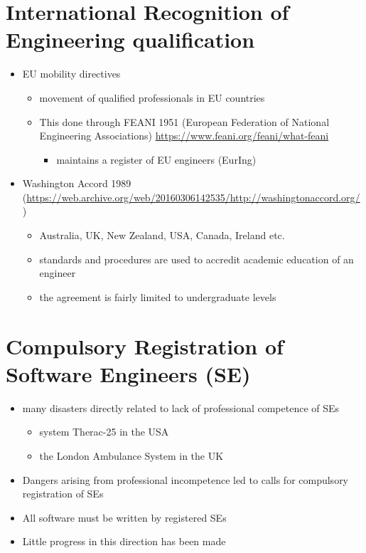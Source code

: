 \documentclass{article}
\begin{document}
\section{International Recognition of Engineering qualification}
\begin{itemize}
\item EU mobility directives
\begin{itemize}
\item movement of qualified professionals in EU countries
\item This done through FEANI 1951 (European Federation of National Engineering Associations) \url{https://www.feani.org/feani/what-feani}
\begin{itemize}
\item maintains a register of EU engineers (EurIng)
\end{itemize}
\end{itemize}
\item Washington Accord 1989 (\url{https://web.archive.org/web/20160306142535/http://washingtonaccord.org/})
\begin{itemize}
\item Australia, UK, New Zealand, USA, Canada, Ireland etc.
\item standards and procedures are used to accredit academic education of an engineer
\item the agreement is fairly limited to undergraduate levels
\end{itemize}
\end{itemize}



\section{Compulsory Registration of Software Engineers (SE)}
\begin{itemize}
\item many disasters directly related to lack of professional competence of SEs
\begin{itemize}
\item system Therac-25 in the USA 
\item the London Ambulance System in the UK 
\end{itemize}
\item Dangers arising from professional incompetence led to calls for compulsory registration of SEs
\item All software must be written by registered SEs
\item Little progress in this direction has been made
\end{itemize}
\end{document}
